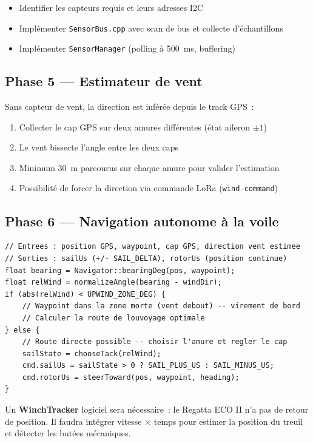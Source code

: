 \documentclass[12pt,a4paper]{article}
\newcommand{\file}[1]{\texttt{#1}}
\begin{document}
\begin{itemize}
  \item Identifier les capteurs requis et leurs adresses I2C
  \item Implémenter \file{SensorBus.cpp} avec scan de bus et collecte d'échantillons
  \item Implémenter \file{SensorManager} (polling à 500~ms, buffering)
\end{itemize}

\subsection{Phase 5 — Estimateur de vent}

Sans capteur de vent, la direction est inférée depuis le track GPS~:

\begin{enumerate}
  \item Collecter le cap GPS sur deux amures différentes (état aileron $\pm1$)
  \item Le vent bissecte l'angle entre les deux caps
  \item Minimum 30~m parcourus sur chaque amure pour valider l'estimation
  \item Possibilité de forcer la direction via commande LoRa (\texttt{wind-command})
\end{enumerate}

\subsection{Phase 6 — Navigation autonome à la voile}

\begin{lstlisting}[style=cpp, caption={Algorithme SailAutoMode (pseudo-code)}]
// Entrees : position GPS, waypoint, cap GPS, direction vent estimee
// Sorties : sailUs (+/- SAIL_DELTA), rotorUs (position continue)
float bearing = Navigator::bearingDeg(pos, waypoint);
float relWind = normalizeAngle(bearing - windDir);
if (abs(relWind) < UPWIND_ZONE_DEG) {
    // Waypoint dans la zone morte (vent debout) -- virement de bord
    // Calculer la route de louvoyage optimale
} else {
    // Route directe possible -- choisir l'amure et regler le cap
    sailState = chooseTack(relWind);
    cmd.sailUs = sailState > 0 ? SAIL_PLUS_US : SAIL_MINUS_US;
    cmd.rotorUs = steerToward(pos, waypoint, heading);
}
\end{lstlisting}

\begin{warningbox}
  Un \textbf{WinchTracker} logiciel sera nécessaire~: le Regatta ECO II
  n'a pas de retour de position. Il faudra intégrer vitesse × temps pour
  estimer la position du treuil et détecter les butées mécaniques.
\end{warningbox}
\end{document}
